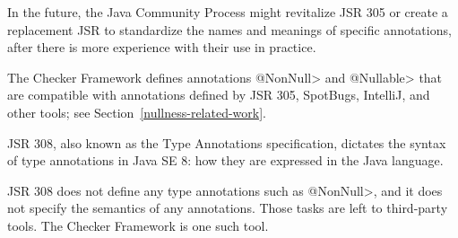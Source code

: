 In the future, the Java Community Process might revitalize JSR 305 or
create a replacement JSR to standardize the names and
meanings of specific annotations, after there is more experience with their
use in practice.



The Checker Framework defines annotations \<@NonNull> and \<@Nullable> that
are compatible with annotations defined by JSR 305, SpotBugs, IntelliJ, and
other tools; see Section~\ref{nullness-related-work}.



JSR 308, also known as the Type Annotations specification, dictates the
syntax of type annotations in Java SE 8:  how they are expressed in the
Java language.

JSR 308 does not define any type annotations such as \<@NonNull>, and it does
not specify the semantics of any annotations.  Those tasks are left to
third-party tools.  The Checker Framework is one such tool.


